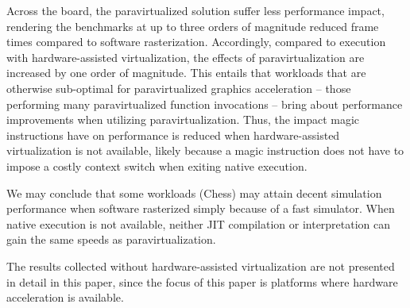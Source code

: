 Across the board, the paravirtualized solution suffer less performance impact, rendering the benchmarks at up to three orders of magnitude reduced frame times compared to software rasterization.
Accordingly, compared to execution with hardware-assisted virtualization, the effects of paravirtualization are increased by one order of magnitude.
This entails that workloads that are otherwise sub-optimal for paravirtualized graphics acceleration -- those performing many paravirtualized function invocations -- bring about performance improvements when utilizing paravirtualization.
Thus, the impact magic instructions have on performance is reduced when hardware-assisted virtualization is not available, likely because a magic instruction does not have to impose a costly context switch when exiting native execution.

We may conclude that some workloads (Chess) may attain decent simulation performance when software rasterized simply because of a fast simulator.
When native execution is not available, neither JIT compilation or interpretation can gain the same speeds as paravirtualization.

The results collected without hardware-assisted virtualization are not presented in detail in this paper, since the focus of this paper is platforms where hardware acceleration is available.
